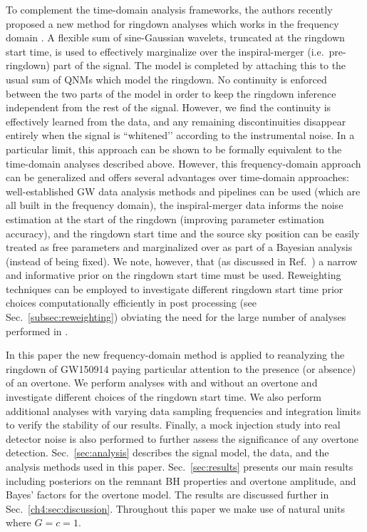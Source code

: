 To complement the time-domain analysis frameworks, the authors recently proposed a new method for ringdown analyses which works in the frequency domain \cite{Finch:2021qph}.
A flexible sum of sine-Gaussian wavelets, truncated at the ringdown start time, is used to effectively marginalize over the inspiral-merger (i.e.\ pre-ringdown) part of the signal.
The model is completed by attaching this to the usual sum of QNMs which model the ringdown.
No continuity is enforced between the two parts of the model in order to keep the ringdown inference independent from the rest of the signal.
However, we find the continuity is effectively learned from the data, and any remaining discontinuities disappear entirely when the signal is ``whitened’’ according to the instrumental noise.
In a particular limit, this approach can be shown to be formally equivalent to the time-domain analyses described above.
However, this frequency-domain approach can be generalized and offers several advantages over time-domain approaches:
well-established GW data analysis methods and pipelines can be used (which are all built in the frequency domain), 
the inspiral-merger data informs the noise estimation at the start of the ringdown (improving parameter estimation accuracy), 
and the ringdown start time and the source sky position can be easily treated as free parameters and marginalized over as part of a Bayesian analysis (instead of being fixed).
We note, however, that (as discussed in Ref.~\cite{Finch:2021qph}) a narrow and informative prior on the ringdown start time must be used.
Reweighting techniques can be employed to investigate different ringdown start time prior choices computationally efficiently in post processing (see Sec.~\ref{subsec:reweighting}) obviating the need for the large number of analyses performed in \cite{Cotesta:2022pci, Isi:2022mhy}.

In this paper the new frequency-domain method is applied to reanalyzing the ringdown of GW150914 paying particular attention to the presence (or absence) of an overtone. 
We perform analyses with and without an overtone and investigate different choices of the ringdown start time. 
We also perform additional analyses with varying data sampling frequencies and integration limits to verify the stability of our results. Finally, a mock injection study into real detector noise is also performed to further assess the significance of any overtone detection.
Sec.~\ref{sec:analysis} describes the signal model, the data, and the analysis methods used in this paper.
Sec.~\ref{sec:results} presents our main results including posteriors on the remnant BH properties and overtone amplitude, and Bayes' factors for the overtone model.
The results are discussed further in Sec.~\ref{ch4:sec:discussion}.
Throughout this paper we make use of natural units where $G=c=1$.

